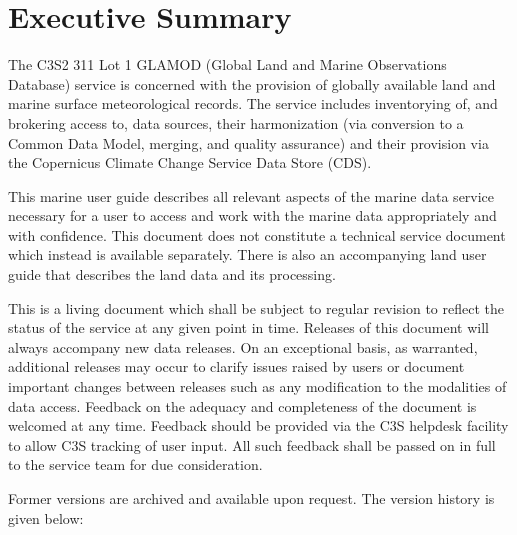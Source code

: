 \section*{Executive Summary}

The C3S2 311 Lot 1 GLAMOD (Global Land and Marine Observations Database) service is concerned with the provision of globally available land and marine surface meteorological records. 
The service includes inventorying of, and brokering access to, data sources, their harmonization (via conversion to a Common Data Model, merging, and quality assurance) and their provision via the Copernicus Climate Change Service Data Store (CDS).

This marine user guide describes all relevant aspects of the marine data service necessary for a user to access and work with the marine data appropriately and with confidence. 
This document does not constitute a technical service document which instead is available separately. 
There is also an accompanying land user guide that describes the land data and its processing.

This is a living document which shall be subject to regular revision to reflect the status of the service at any given point in time. Releases of this document will always accompany new data releases. On an exceptional basis, as warranted, additional releases may occur to clarify issues raised by users or document important changes between releases such as any modification to the modalities of data access. Feedback on the adequacy and completeness of the document is welcomed at any time. Feedback should be provided via the C3S helpdesk facility to allow C3S tracking of user input. All such feedback shall be passed on in full to the service team for due consideration.

Former versions are archived and available upon request. The version history is given below:

